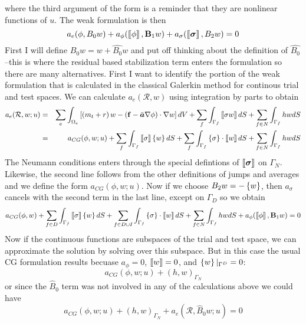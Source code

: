 \documentclass[10pt,dvips,twoside,reqno]{amsart}
\begin{document}
where the third argument of the form is a reminder that they are nonlinear functions of $u$.
The weak formulation is then
\begin{equation}
a_e(\phi,B_0 w) + a_{\phi}(\dbl \phi \dbr, \vec B_1 w) + a_{\sigma}(\dbl \gvec \sigma \dbr, B_2 w) = 0 
\end{equation}
First I will define $B_0 w = w + \hat{B_0} w$ and put off thinking
about the definition of $\hat{B_0}$--this is where the residual based
stabilization term enters the formulation so there are many
alternatives. First I want to identify the portion of the weak
formulation that is calculated in the classical Galerkin method for
continous trial and test spaces. We can calculate $a_e(\mathcal{R},w)$ using
integration by parts to obtain
\begin{eqnarray}
a_e(\mathcal{R},w;u) &=& \sum_e \int_{\Omega_e} \sbl \pl m_t + r\pr w - \pl \vec f - \ten a \grad \phi \pr  \cdot \grad w \sbr dV + \sum_f \int_{\Gamma_f} \dbl \sigma w \dbr dS + \sum_{f \in N} \int_{\Gamma_f} hw dS  \\
&=& a_{CG}(\phi,w;u) + \sum_{f} \int_{\Gamma_f} \dbl \sigma \dbr \cbl w \cbr dS + \sum_{f} \int_{\Gamma_f} \cbl \sigma \cbr \cdot \dbl w \dbr dS +  \sum_{f \in N} \int_{\Gamma_f} hw dS  
\end{eqnarray} 
The Neumann conditions enters through the special defintions of $\dbl
\gvec \sigma \dbr$ on  $\Gamma_N$. Likewise, the second line follows from
the other definitions of jumps and averages and we define the form $a_{CG}(\phi,w;u)$. Now if we choose $B_2 w =
- \left\{ w \right\}$, then $a_{\sigma}$ cancels with the second term in the
last line, except on $\Gamma_D$ so we obtain
\begin{equation}
  a_{CG}(\phi,w) + \sum_{f \in D } \int_{\Gamma_f} \dbl \sigma \dbr \cbl w \cbr dS + \sum_{f \in D \cup I} \int_{\Gamma_f} \cbl \sigma \cbr \cdot \dbl w \dbr dS + \sum_{f \in N} \int_{\Gamma_f} hw dS + a_{\phi}(\dbl \phi \dbr, \vec B_1 w) = 0 
\end{equation}
Now if the continuous functions are subspaces of the trial and test
space, we can approximate the solution by solving over this subspace.
But in this case the usual CG formulation results becuase
$a_{\phi} = 0$, $\dbl w \dbr = 0$, and $\left\{ w \right\}|_{\Gamma^D} = 0$:
\begin{equation}
a_{CG}(\phi,w;u) + (h,w)_{\Gamma_N}
\end{equation}
or since the $\hat{B}_0$ term was not involved in any of the
calculations above we could have
\begin{equation}
  a_{CG}(\phi,w;u) + (h,w)_{\Gamma_N}  + a_e(\mathcal{R}, \hat{B}_0 w;u) = 0 
\end{equation}
\end{document}
